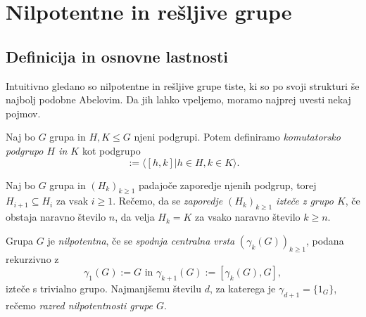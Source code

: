 \section{Nilpotentne in rešljive grupe}

\subsection{Definicija in osnovne lastnosti}

Intuitivno gledano so nilpotentne in rešljive grupe tiste, ki so po svoji strukturi še najbolj podobne Abelovim. Da jih lahko vpeljemo, moramo najprej uvesti nekaj pojmov.
\begin{definicija}\label{def_komutator_grup}
    Naj bo $G$ grupa in $H, K \le G$ njeni podgrupi. Potem definiramo \emph{komutatorsko podgrupo $H$ in $K$} kot podgrupo \begin{equation*}
        [H, K]  := \langle [h, k] | h \in H, k \in K \rangle.
    \end{equation*}
\end{definicija}

\begin{definicija}
\label{def_iztek_zaporedja}
Naj bo $G$ grupa in $(H_k)_{k \ge 1}$ padajoče zaporedje njenih podgrup, torej $H_{i + 1} \subseteq H_{i}$ za vsak $i \ge 1$. 
Rečemo, da se \emph{zaporedje $(H_k)_{k \ge 1}$ izteče z grupo $K$}, če obstaja naravno število $n$, da velja $H_k = K$ za vsako naravno število $k \ge n$.
\end{definicija}

\begin{definicija}
\label{def_nilpotentna_grupa}
Grupa $G$ je \emph{nilpotentna}, če se \emph{spodnja centralna vrsta} $(\gamma_k(G))_{k \ge 1}$, podana rekurzivno z \begin{equation*}
\gamma_1(G) := G \text{ in } \gamma_{k +1}(G) := [\gamma_k(G), G],
\end{equation*}  
izteče s trivialno grupo. Najmanjšemu številu $d$, za katerega je $\gamma_{d + 1} = \{ 1_G \}$, rečemo \emph{razred nilpotentnosti grupe $G$}.    
\end{definicija}

